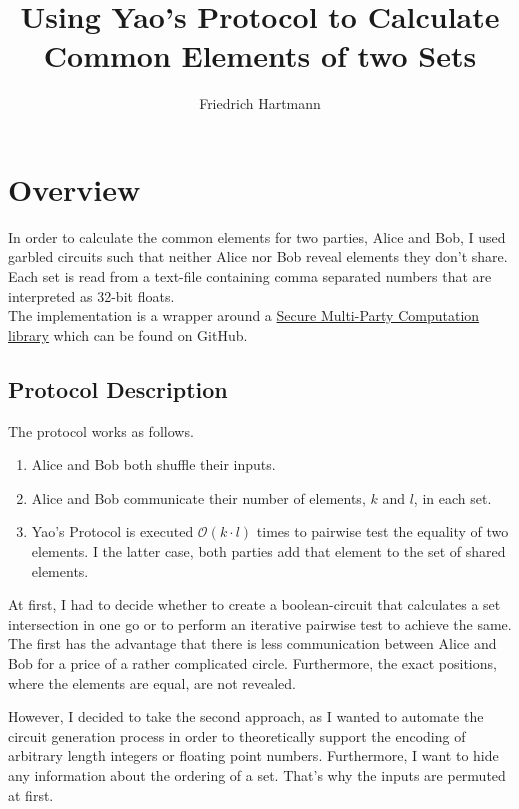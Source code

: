 \documentclass[a4paper,12pt]{scrartcl}
\title{Using Yao's Protocol to Calculate Common Elements of two Sets}
\author{Friedrich Hartmann}
\begin{document}
\maketitle

\tableofcontents 

\section{Overview}

In order to calculate the common elements for two parties, Alice and Bob, I used garbled circuits such that neither Alice nor Bob reveal elements they don't share.
Each set is read from a text-file containing comma separated numbers that are interpreted as 32-bit floats. \\
The implementation is a wrapper around a \href{https://github.com/ojroques/garbled-circuit}{Secure Multi-Party Computation library} which can be found on GitHub.  


\subsection{Protocol Description}

The protocol works as follows. 


\begin{enumerate}
 \item Alice and Bob both shuffle their inputs. 
 
 \item Alice and Bob communicate their number of elements, $k$ and $l$, in each set. 
 
 \item Yao's Protocol is executed $\mathcal{O}(k \cdot l)$ times to pairwise test the equality of two elements. I the latter case, both parties add that element to the set of shared elements.
 
\end{enumerate}


At first, I had to decide whether to create a boolean-circuit that calculates a set intersection in one go or to perform an iterative pairwise test to achieve the same. The first has the advantage that there is less communication between Alice and Bob for a price of a rather complicated circle. Furthermore, the exact positions, where the elements are equal, are not revealed. 

However, I decided to take the second approach, as I wanted to automate the circuit generation process in order to theoretically support the encoding of arbitrary length integers or floating point numbers. Furthermore, I want to hide any information about the ordering of a set. That's why the inputs are permuted at first.   
\end{document}
